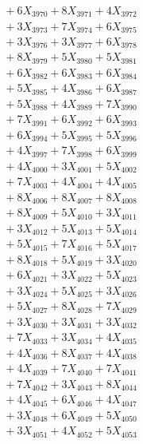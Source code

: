 \documentclass[a4paper,10pt]{article}
\begin{document}
{\begin{align}
&\;  + 6 X_{3970} + 8 X_{3971} + 4 X_{3972} \\[0.3ex]
&\;  + 3 X_{3973} + 7 X_{3974} + 6 X_{3975} \\[0.3ex]
&\;  + 3 X_{3976} + 3 X_{3977} + 6 X_{3978} \\[0.3ex]
&\;  + 8 X_{3979} + 5 X_{3980} + 5 X_{3981} \\[0.3ex]
&\;  + 6 X_{3982} + 6 X_{3983} + 6 X_{3984} \\[0.3ex]
&\;  + 5 X_{3985} + 4 X_{3986} + 6 X_{3987} \\[0.3ex]
&\;  + 5 X_{3988} + 4 X_{3989} + 7 X_{3990} \\[0.3ex]
&\;  + 7 X_{3991} + 6 X_{3992} + 6 X_{3993} \\[0.3ex]
&\;  + 6 X_{3994} + 5 X_{3995} + 5 X_{3996} \\[0.3ex]
&\;  + 4 X_{3997} + 7 X_{3998} + 6 X_{3999} \\[0.5ex]\allowbreak
&\;  + 4 X_{4000} + 3 X_{4001} + 5 X_{4002} \\[0.3ex]
&\;  + 7 X_{4003} + 4 X_{4004} + 4 X_{4005} \\[0.3ex]
&\;  + 8 X_{4006} + 8 X_{4007} + 8 X_{4008} \\[0.3ex]
&\;  + 8 X_{4009} + 5 X_{4010} + 3 X_{4011} \\[0.3ex]
&\;  + 3 X_{4012} + 5 X_{4013} + 5 X_{4014} \\[0.3ex]
&\;  + 5 X_{4015} + 7 X_{4016} + 5 X_{4017} \\[0.3ex]
&\;  + 8 X_{4018} + 5 X_{4019} + 3 X_{4020} \\[0.3ex]
&\;  + 6 X_{4021} + 3 X_{4022} + 5 X_{4023} \\[0.3ex]
&\;  + 3 X_{4024} + 5 X_{4025} + 3 X_{4026} \\[0.3ex]
&\;  + 5 X_{4027} + 8 X_{4028} + 7 X_{4029} \\[0.5ex]\allowbreak
&\;  + 3 X_{4030} + 3 X_{4031} + 3 X_{4032} \\[0.3ex]
&\;  + 7 X_{4033} + 3 X_{4034} + 4 X_{4035} \\[0.3ex]
&\;  + 4 X_{4036} + 8 X_{4037} + 4 X_{4038} \\[0.3ex]
&\;  + 4 X_{4039} + 7 X_{4040} + 7 X_{4041} \\[0.3ex]
&\;  + 7 X_{4042} + 3 X_{4043} + 8 X_{4044} \\[0.3ex]
&\;  + 4 X_{4045} + 6 X_{4046} + 4 X_{4047} \\[0.3ex]
&\;  + 3 X_{4048} + 6 X_{4049} + 5 X_{4050} \\[0.3ex]
&\;  + 3 X_{4051} + 4 X_{4052} + 5 X_{4053} \\[0.3ex]

\end{align}}
\end{document}
